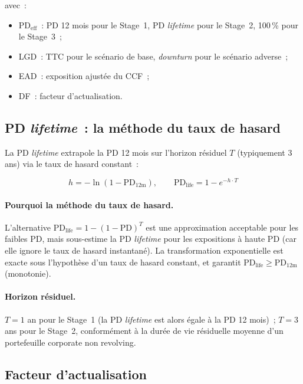 \documentclass[12pt, a4paper, twoside, openright]{report}
\theoremstyle{definition}
\begin{document}
\noindent avec~:
\begin{itemize}[nosep]
  \item $\text{PD}_{\text{eff}}$~: PD 12 mois pour le Stage~1, PD \emph{lifetime} pour le Stage~2, 100\,\% pour le Stage~3~;
  \item LGD~: TTC pour le scénario de base, \emph{downturn} pour le scénario adverse~;
  \item EAD~: exposition ajustée du CCF~;
  \item DF~: facteur d'actualisation.
\end{itemize}

\subsection{PD \emph{lifetime}~: la méthode du taux de hasard}

La PD \emph{lifetime} extrapole la PD 12 mois sur l'horizon résiduel $T$ (typiquement 3 ans) via le taux de hasard constant~:

\begin{equation}
h = -\ln(1 - \text{PD}_{12\text{m}}), \qquad \text{PD}_{\text{life}} = 1 - e^{-h \cdot T}
\label{eq:pd-lifetime}
\end{equation}

\paragraph{Pourquoi la méthode du taux de hasard.} L'alternative $\text{PD}_{\text{life}} = 1 - (1-\text{PD})^T$ est une approximation acceptable pour les faibles PD, mais sous-estime la PD \emph{lifetime} pour les expositions à haute PD (car elle ignore le taux de hasard instantané). La transformation exponentielle est exacte sous l'hypothèse d'un taux de hasard constant, et garantit $\text{PD}_{\text{life}} \geq \text{PD}_{12\text{m}}$ (monotonie).

\paragraph{Horizon résiduel.} $T = 1$ an pour le Stage~1 (la PD \emph{lifetime} est alors égale à la PD 12 mois)~; $T = 3$ ans pour le Stage~2, conformément à la durée de vie résiduelle moyenne d'un portefeuille corporate non revolving.

\subsection{Facteur d'actualisation}
\end{document}
